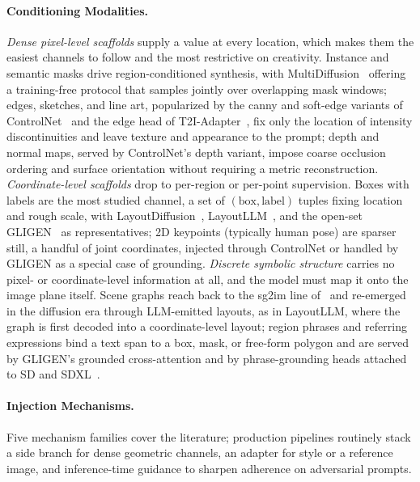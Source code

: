 \paragraph{Conditioning Modalities.}
\label{para:p3_s8_1_2_modalities}
\textit{Dense pixel-level scaffolds} supply a value at every location, which makes them the easiest channels to follow and the most restrictive on creativity.
Instance and semantic masks drive region-conditioned synthesis, with MultiDiffusion~\cite{multidiffusion} offering a training-free protocol that samples jointly over overlapping mask windows; edges, sketches, and line art, popularized by the canny and soft-edge variants of ControlNet~\cite{zhang2023adding} and the edge head of T2I-Adapter~\cite{t2iadapter2023}, fix only the location of intensity discontinuities and leave texture and appearance to the prompt; depth and normal maps, served by ControlNet's depth variant, impose coarse occlusion ordering and surface orientation without requiring a metric reconstruction.
\textit{Coordinate-level scaffolds} drop to per-region or per-point supervision.
Boxes with labels are the most studied channel, a set of $(\text{box},\text{label})$ tuples fixing location and rough scale, with LayoutDiffusion~\cite{zheng2023layoutdiffusion}, LayoutLLM~\cite{qu2023layoutllm}, and the open-set GLIGEN~\cite{li2023gligen} as representatives; 2D keypoints (typically human pose) are sparser still, a handful of joint coordinates, injected through ControlNet or handled by GLIGEN as a special case of grounding.
\textit{Discrete symbolic structure} carries no pixel- or coordinate-level information at all, and the model must map it onto the image plane itself.
Scene graphs reach back to the sg2im line of~\citet{johnson2018image} and re-emerged in the diffusion era through LLM-emitted layouts, as in LayoutLLM, where the graph is first decoded into a coordinate-level layout; region phrases and referring expressions bind a text span to a box, mask, or free-form polygon and are served by GLIGEN's grounded cross-attention and by phrase-grounding heads attached to SD and SDXL~\cite{sdxl2023}.

\paragraph{Injection Mechanisms.}
\label{para:p3_s8_1_2_mechanisms}
Five mechanism families cover the literature; production pipelines routinely stack a side branch for dense geometric channels, an adapter for style or a reference image, and inference-time guidance to sharpen adherence on adversarial prompts.

